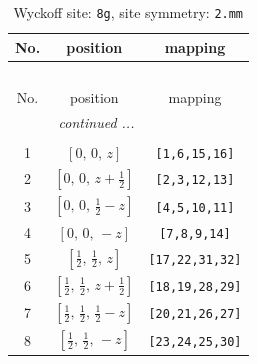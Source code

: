 \documentclass[fleqn,8pt]{jsarticle}
\begin{document}
\renewcommand{\arraystretch}{1.2}
\begin{longtable}{ccc}
\caption{Wyckoff site: {\tt 8g}, site symmetry: {\tt 2.mm}}
 \\
 \hline \hline
No. & position & mapping \\ \hline \endfirsthead

\multicolumn{2}{l}{\tablename\ \thetable{}} \\
 \hline \hline
No. & position & mapping \\ \hline \endhead

 \hline \hline
\multicolumn{2}{r}{\footnotesize\it continued ...} \\ \endfoot

 \hline \hline
\multicolumn{2}{r}{} \\ \endlastfoot

1 & $\left[ 0,\, 0,\, z \right]$ & {\tt [1,6,15,16]} \\ \hline
2 & $\left[ 0,\, 0,\, z + \frac{1}{2} \right]$ & {\tt [2,3,12,13]} \\ \hline
3 & $\left[ 0,\, 0,\, \frac{1}{2} - z \right]$ & {\tt [4,5,10,11]} \\ \hline
4 & $\left[ 0,\, 0,\, - z \right]$ & {\tt [7,8,9,14]} \\ \hline
5 & $\left[ \frac{1}{2},\, \frac{1}{2},\, z \right]$ & {\tt [17,22,31,32]} \\ \hline
6 & $\left[ \frac{1}{2},\, \frac{1}{2},\, z + \frac{1}{2} \right]$ & {\tt [18,19,28,29]} \\ \hline
7 & $\left[ \frac{1}{2},\, \frac{1}{2},\, \frac{1}{2} - z \right]$ & {\tt [20,21,26,27]} \\ \hline
8 & $\left[ \frac{1}{2},\, \frac{1}{2},\, - z \right]$ & {\tt [23,24,25,30]} \\
\end{longtable}
\renewcommand{\arraystretch}{1.2}
\end{document}
